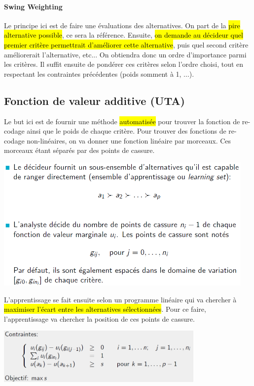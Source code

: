 \documentclass[a4paper, 12pt]{article}
\newcommand{\alinea}{
\hspace*{0.5cm}}
\begin{document}
			\paragraph{Swing Weighting}
				\alinea Le principe ici est de faire une évaluations des alternatives. On part de la \hl{pire alternative possible},
					ce sera la référence. Ensuite, \hl{on demande au décideur quel premier critère permettrait d'améliorer cette
					alternative}, puis quel second critère améliorerait l'alternative, etc... On obtiendra donc un ordre d'importance 
					parmi les critères. Il suffit ensuite de pondérer ces critères selon l'ordre choisi, tout en respectant les 
					contraintes précédentes (poids somment à 1, ...).
	\subsection{Fonction de valeur additive (UTA)}
		\alinea Le but ici est de fournir une méthode \hl{automatisée} pour trouver la fonction de re-codage ainsi que le poids de 
			chaque critère. Pour trouver des fonctions de re-codage non-linéaires, on va donner une fonction linéaire par morceaux.
			Ces morceaux étant séparés par des points de cassure.
		\begin{center}
			\includegraphics[width=5in]{Images/UTA0}
		\end{center}
		\alinea L'apprentissage se fait ensuite selon un programme linéaire qui va chercher à \hl{maximiser l'écart entre les alternatives
			sélectionnées}.	Pour ce faire, l'apprentissage va chercher la position de ces points de cassure.
		\begin{center}
			\includegraphics[width=4in]{Images/UTA1}
		\end{center}
\end{document}
